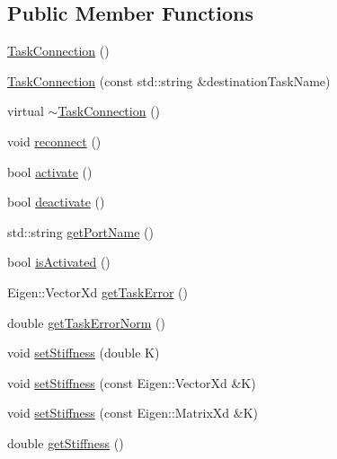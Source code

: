 \subsection*{Public Member Functions}
\begin{DoxyCompactItemize}
\item 
\hyperlink{classocra__recipes_1_1TaskConnection_a57b78d2652778a07949377622e86e5d7}{Task\+Connection} ()
\item 
\hyperlink{classocra__recipes_1_1TaskConnection_a8a7b431e1c53e50428e3c369892d266e}{Task\+Connection} (const std\+::string \&destination\+Task\+Name)
\item 
virtual \hyperlink{classocra__recipes_1_1TaskConnection_aa2a733dfaa80f32fa95f45c2d98f6106}{$\sim$\+Task\+Connection} ()
\item 
void \hyperlink{classocra__recipes_1_1TaskConnection_a416154f1cd736647003442d905b9862e}{reconnect} ()
\item 
bool \hyperlink{classocra__recipes_1_1TaskConnection_a64c0f6623daace3ac9030ec620ed98a2}{activate} ()
\item 
bool \hyperlink{classocra__recipes_1_1TaskConnection_a8488250380b7fd9598f3246ec6111d6a}{deactivate} ()
\item 
std\+::string \hyperlink{classocra__recipes_1_1TaskConnection_a9898d85644f690d4b0e5d5a2c8338d63}{get\+Port\+Name} ()
\item 
bool \hyperlink{classocra__recipes_1_1TaskConnection_a07179a0e687fd28d091eeebb1157fac0}{is\+Activated} ()
\item 
Eigen\+::\+Vector\+Xd \hyperlink{classocra__recipes_1_1TaskConnection_ab968ad0f0a818f240eed58f1780f8586}{get\+Task\+Error} ()
\item 
double \hyperlink{classocra__recipes_1_1TaskConnection_a2639764e4b7fe55aa29dce82a2268b3a}{get\+Task\+Error\+Norm} ()
\item 
void \hyperlink{classocra__recipes_1_1TaskConnection_a4db37203b270702fda22a81ef15b1a77}{set\+Stiffness} (double K)
\item 
void \hyperlink{classocra__recipes_1_1TaskConnection_afcd68e61fdaadfe705b62194f07f7a3a}{set\+Stiffness} (const Eigen\+::\+Vector\+Xd \&K)
\item 
void \hyperlink{classocra__recipes_1_1TaskConnection_adc34c0f28b0833548d72346823e58489}{set\+Stiffness} (const Eigen\+::\+Matrix\+Xd \&K)
\item 
double \hyperlink{classocra__recipes_1_1TaskConnection_a88bda0e9df65e379e1b7f5b89929fdde}{get\+Stiffness} ()
\item 

\end{DoxyCompactItemize}
